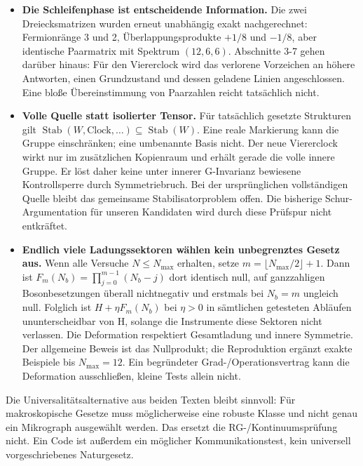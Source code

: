 \begin{itemize}
\tightlist
\item
  \textbf{Die Schleifenphase ist entscheidende Information.} Die zwei
  Dreiecksmatrizen wurden erneut unabhängig exakt nachgerechnet:
  Fermionränge 3 und 2, Überlappungsprodukte \(+1/8\) und \(-1/8\), aber
  identische Paarmatrix mit Spektrum \((12,6,6)\). Abschnitte 3-7 gehen
  darüber hinaus: Für den Viererclock wird das verlorene Vorzeichen an
  höhere Antworten, einen Grundzustand und dessen geladene Linien
  angeschlossen. Eine bloße Übereinstimmung von Paarzahlen reicht
  tatsächlich nicht.
\item
  \textbf{Volle Quelle statt isolierter Tensor.} Für tatsächlich
  gesetzte Strukturen gilt
  \(\operatorname{Stab}(W,\text{Clock},\ldots)\subseteq\operatorname{Stab}(W)\).
  Eine reale Markierung kann die Gruppe einschränken; eine umbenannte
  Basis nicht. Der neue Viererclock wirkt nur im zusätzlichen Kopienraum
  und erhält gerade die volle innere Gruppe. Er löst daher keine unter
  innerer G-Invarianz bewiesene Kontrollsperre durch Symmetriebruch. Bei
  der ursprünglichen vollständigen Quelle bleibt das gemeinsame
  Stabilisatorproblem offen. Die bisherige Schur-Argumentation für
  unseren Kandidaten wird durch diese Prüfspur nicht entkräftet.
\item
  \textbf{Endlich viele Ladungssektoren wählen kein unbegrenztes Gesetz
  aus.} Wenn alle Versuche \(N\le N_{\max}\) erhalten, setze
  \(m=\lfloor N_{\max}/2\rfloor+1\). Dann ist
  \(F_m(N_b)=\prod_{j=0}^{m-1}(N_b-j)\) dort identisch null, auf
  ganzzahligen Bosonbesetzungen überall nichtnegativ und erstmals bei
  \(N_b=m\) ungleich null. Folglich ist \(H+\eta F_m(N_b)\) bei
  \(\eta>0\) in sämtlichen getesteten Abläufen ununterscheidbar von H,
  solange die Instrumente diese Sektoren nicht verlassen. Die
  Deformation respektiert Gesamtladung und innere Symmetrie. Der
  allgemeine Beweis ist das Nullprodukt; die Reproduktion ergänzt exakte
  Beispiele bis \(N_{\max}=12\). Ein begründeter Grad-/Operationsvertrag
  kann die Deformation ausschließen, kleine Tests allein nicht.
\end{itemize}

Die Universalitätsalternative aus beiden Texten bleibt sinnvoll: Für
makroskopische Gesetze muss möglicherweise eine robuste Klasse und nicht
genau ein Mikrograph ausgewählt werden. Das ersetzt die
RG-/Kontinuumsprüfung nicht. Ein Code ist außerdem ein möglicher
Kommunikationstest, kein universell vorgeschriebenes Naturgesetz.

